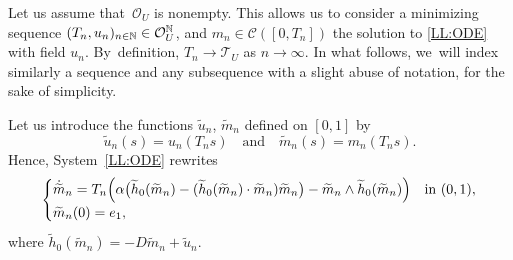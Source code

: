 \documentclass[10pt]{amsart}
\theoremstyle{definition}
\newcommand{\N} {\mathbb{N}}
\begin{document}

Let us assume that~$\mathcal{O}_{U }$ is nonempty. This allows us to consider a minimizing \hbox{sequence} $(T_n,u_n)_{n\in\N}\in\nobreak \mathcal{O}_{U }^\N$, and $m_n \in \mathscr{C}([0,T_n])$ the solution to \eqref{LL:ODE} with field $u_n$.
By~definition, $T_n \to \mathcal{T}_U$ as $n \to \infty$.
In what follows, we~will index similarly a sequence and any subsequence with a slight abuse of notation, for the sake of simplicity.

Let us introduce the functions $\widetilde{u}_n$, $\widetilde{m}_{n}$ defined on $[0,1]$ by
\[
\widetilde{u}_n(s)=u_n(T_ns)\quad \text{and}\quad \widetilde{m}_{n}(s)=m_{n}(T_ns).
\]
Hence, System~\eqref{LL:ODE} rewrites
\begin{equation}\label{LL:ODEbis}
\begin{cases}
\dot{\widetilde{m}}_n = T_n \Bigl(\alpha \bigl(\widetilde{h}_0(\widetilde{m}_n)-(\widetilde{h}_0(\widetilde{m}_n)\cdot \widetilde{m}_n) \widetilde{m}_n\bigr)-\widetilde{m}_n\wedge \widetilde{h}_0(\widetilde{m}_n)\Bigr)& \text{in }(0,1), \\
\widetilde{m}_n(0) =e_1,
\end{cases}
\end{equation}
where $\widetilde{h}_0(\widetilde{m}_n)=-D\widetilde{m}_{n}+\widetilde{u}_n$.
\end{document}
